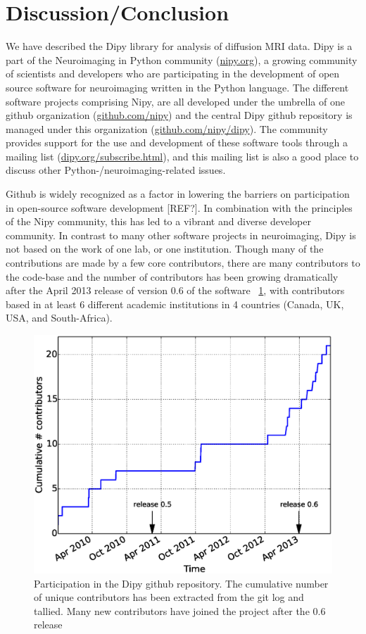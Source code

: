 \documentclass{bioinfo}
\begin{document}
\section{Discussion/Conclusion}

We have described the Dipy library for analysis of diffusion MRI data. Dipy is
a part of the Neuroimaging in Python community (\url{nipy.org}), a growing
community of scientists and developers who are participating in the development
of open source software for neuroimaging written in the Python language. The
different software projects comprising Nipy, are all developed under the
umbrella of one github organization (\url{github.com/nipy}) and the central
Dipy github repository is managed under this organization
(\url{github.com/nipy/dipy}).  The community provides support for the use and
development of these software tools through a mailing list
(\url{dipy.org/subscribe.html}), and this mailing
list is also a good place to discuss other Python-/neuroimaging-related issues.

Github is widely recognized as a factor in lowering the barriers on
participation in open-source software development [REF?]. In combination with
the principles of the Nipy community, this has led to a vibrant and diverse
developer community. In contrast to many other software projects in
neuroimaging, Dipy is not based on the work of one lab, or one institution. Though
many of the contributions are made by a few core contributors, there are many
contributors to the code-base and the number of contributors has been growing
dramatically after the April 2013 release of version 0.6 of the software
~\ref{Fig:gh_stats}, with contributors based in at least 6 different academic
institutions in 4 countries (Canada, UK, USA, and South-Africa).

\begin{figure}
\centering{}
\includegraphics[scale=0.37]{Figures/fig-gh.eps}
\caption{Participation in the Dipy github repository. The cumulative number of
  unique contributors has been extracted from the git log and tallied. Many
  new contributors have joined the project after the 0.6 release\label{Fig:gh_stats}}
\end{figure}
\end{document}
